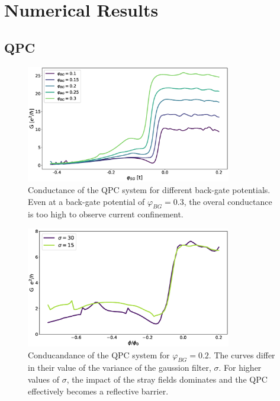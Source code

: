 \chapter{Numerical Results}
\label{ch:numerical-results}

\section{QPC}
\begin{figure}[ht]
\centering
\includegraphics[width=0.8\textwidth]{figure/numericalmodel/qpc-conductance}
\caption{Conductance of the QPC system for different back-gate potentials. Even at a back-gate potential of $\varphi_{BG} = 0.3$, the overal conductance is too high to observe current confinement.} \label{fig:qpc-conductance}
\end{figure}
\begin{figure}
\centering
\includegraphics[width=0.8\textwidth]{figure/numericalmodel/conductance-sigma}
\caption{Conducandance of the QPC system for $\varphi_{BG} = 0.2$. The curves differ in their value of the variance of the gaussion filter, $\sigma$. For higher values of $\sigma$, the impact of the stray fields dominates and the QPC effectively becomes a reflective barrier.}\label{fig:qpc-conductance-sigma}
\end{figure}

